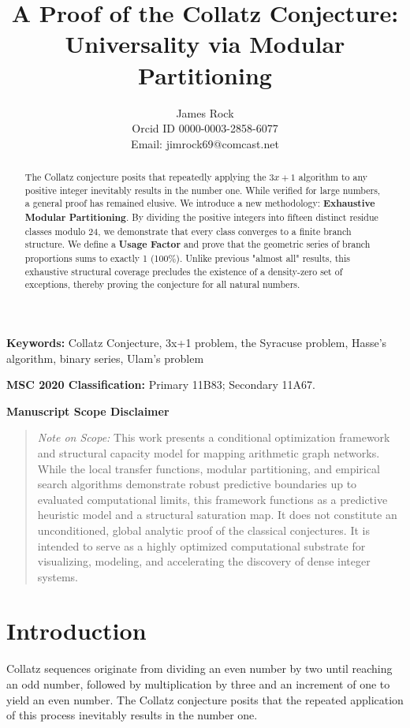 \documentclass[sn-mathphys-num, pdflatex]{sn-jnl}
\title{A Proof of the Collatz Conjecture: Universality via Modular Partitioning}
\author{\begin{center}James Rock \\ Orcid ID 0000-0003-2858-6077 \\ Email: jimrock69@comcast.net \end{center}}
\date{}
\begin{document}
\maketitle

\begin{abstract}
{}The Collatz conjecture posits that repeatedly applying the $3x+1$ algorithm to any positive integer inevitably results in the number one. While verified for large numbers, a general proof has remained elusive. We introduce a new methodology: \textbf{Exhaustive Modular Partitioning}. By dividing the positive integers into fifteen distinct residue classes modulo 24, we demonstrate that every class converges to a finite branch structure. We define a \textbf{Usage Factor} and prove that the geometric series of branch proportions sums to exactly 1 (100\%). Unlike previous "almost all" results, this exhaustive structural coverage precludes the existence of a density-zero set of exceptions, thereby proving the conjecture for all natural numbers.
\end{abstract}

\noindent \textbf{Keywords:} Collatz Conjecture, 3x+1 problem, the Syracuse problem, Hasse’s algorithm, binary series, Ulam’s problem

\noindent \textbf{MSC 2020 Classification:} Primary 11B83; Secondary 11A67. 

\vspace{0.4cm}
\begin{center}
    \small
    \textbf{Manuscript Scope Disclaimer}
\end{center}
\begin{quote}
    \small \textit{Note on Scope:} This work presents a conditional optimization framework and structural capacity model for mapping arithmetic graph networks. While the local transfer functions, modular partitioning, and empirical search algorithms demonstrate robust predictive boundaries up to evaluated computational limits, this framework functions as a predictive heuristic model and a structural saturation map. It does not constitute an unconditioned, global analytic proof of the classical conjectures. It is intended to serve as a highly optimized computational substrate for visualizing, modeling, and accelerating the discovery of dense integer systems.
\end{quote}
\vspace{0.4cm}

\section{Introduction} \label{sec1}
Collatz sequences originate from dividing an even number by two until reaching an odd number, followed by multiplication by three and an increment of one to yield an even number. The Collatz conjecture posits that the repeated application of this process inevitably results in the number one.
\end{document}
